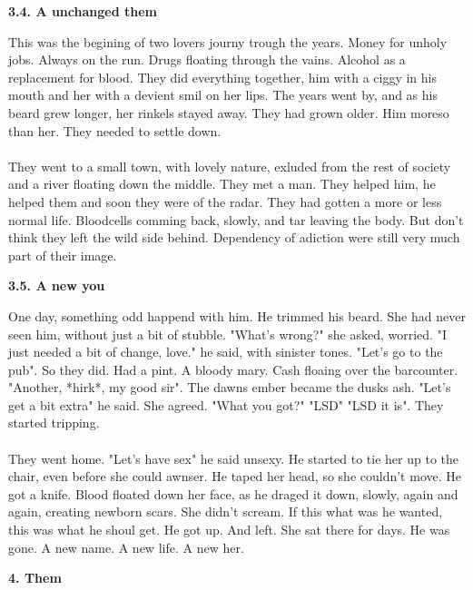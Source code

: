 \documentclass[]{article}
\begin{document}
\begin{center}
	\textbf{3.4. A unchanged them}
\end{center}

This was the begining of two lovers journy trough the years. Money for unholy jobs. Always on the run. Drugs floating through the vains. Alcohol as a replacement for blood. They did everything together, him with a ciggy in his mouth and her with a devient smil on her lips. The years went by, and as his beard grew longer, her rinkels stayed away. They had grown older. Him moreso than her. They needed to settle down. 
\\ \\
They went to a small town, with lovely nature, exluded from the rest of society and a river floating down the middle. They met a man. They helped him, he helped them and soon they were of the radar. They had gotten a more or less normal life. Bloodcells comming back, slowly, and tar leaving the body. But don't think they left the wild side behind. Dependency of adiction were still very much part of their image.

\begin{center}
	\textbf{3.5. A new you}
\end{center}

One day, something odd happend with him. He trimmed his beard. She had never seen him, without just a bit of stubble. "What's wrong?" she asked, worried. "I just needed a bit of change, love." he said, with sinister tones. "Let's go to the pub". So they did. Had a pint. A bloody mary. Cash floaing over the barcounter. "Another, *hirk*, my good sir". The dawns ember became the dusks ash. "Let's get a bit extra" he said. She agreed. "What you got?" "LSD" "LSD it is". They started tripping. 
\\ \\
They went home. "Let's have sex" he said unsexy. He started to tie her up to the chair, even before she could awnser. He taped her head, so she couldn't move. He got a knife. Blood floated down her face, as he draged it down, slowly, again and again, creating newborn scars. She didn't scream. If this what was he wanted, this was what he shoul get. He got up. And left. She sat there for days. He was gone. A new name. A new life. A new her.

\newpage

\begin{center}
	\large\textbf{4. Them}
\end{center}
\end{document}
